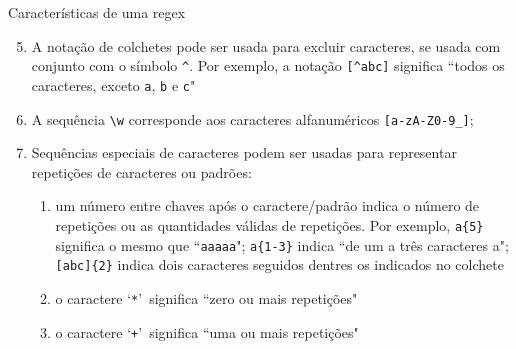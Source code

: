 \begin{frame}[fragile]{Características de uma regex}

    \begin{enumerate}
        \setcounter{enumi}{4}

        \item A notação de colchetes pode ser usada para excluir caracteres, se usada com conjunto com o símbolo \verb|^|. Por exemplo, a notação \verb|[^abc]| significa ``todos os caracteres, exceto \texttt{a}, \texttt{b} e \texttt{c}"
        \pause
        \item A sequência \verb|\w| corresponde aos caracteres alfanuméricos \verb|[a-zA-Z0-9_]|;
        \pause
        \item Sequências especiais de caracteres podem ser usadas para representar repetições de caracteres ou padrões:
        \pause
        \begin{enumerate}
            \item um número entre chaves após o caractere/padrão indica o número de repetições ou 
                as quantidades válidas de repetições. Por exemplo, \verb|a{5}| significa o mesmo 
                que ``\texttt{aaaaa}"; \verb|a{1-3}| indica ``de um a três caracteres a"; 
                \verb|[abc]{2}| indica dois caracteres seguidos dentres os indicados no colchete
        \pause
            \item o caractere \lq \verb|*|\rq\ significa ``zero ou mais repetições"
        \pause
            \item o caractere \lq \verb|+|\rq\ significa ``uma ou mais repetições"

        \end{enumerate}
    \end{enumerate}

\end{frame}

